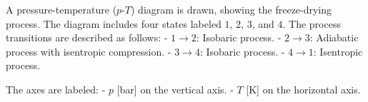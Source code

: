 A pressure-temperature (\( p \)-\( T \)) diagram is drawn, showing the freeze-drying process. The diagram includes four states labeled \( 1 \), \( 2 \), \( 3 \), and \( 4 \). The process transitions are described as follows:  
- \( 1 \to 2 \): Isobaric process.  
- \( 2 \to 3 \): Adiabatic process with isentropic compression.  
- \( 3 \to 4 \): Isobaric process.  
- \( 4 \to 1 \): Isentropic process.  

The axes are labeled:  
- \( p \) [bar] on the vertical axis.  
- \( T \) [K] on the horizontal axis.